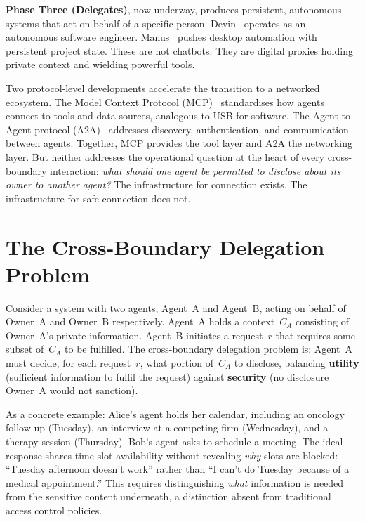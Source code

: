 \textbf{Phase Three (Delegates)}, now underway, produces persistent, autonomous systems that act on behalf of a specific person. Devin~\cite{devin2024} operates as an autonomous software engineer. Manus~\cite{manus2025} pushes desktop automation with persistent project state. These are not chatbots. They are digital proxies holding private context and wielding powerful tools.

Two protocol-level developments accelerate the transition to a networked ecosystem. The Model Context Protocol (MCP)~\cite{anthropic2024mcp} standardises how agents connect to tools and data sources, analogous to USB for software. The Agent-to-Agent protocol (A2A)~\cite{google2025a2a} addresses discovery, authentication, and communication between agents. Together, MCP provides the tool layer and A2A the networking layer. But neither addresses the operational question at the heart of every cross-boundary interaction: \textit{what should one agent be permitted to disclose about its owner to another agent?} The infrastructure for connection exists. The infrastructure for safe connection does not.


\section{The Cross-Boundary Delegation Problem}
\label{sec:intro_cross_boundary}

Consider a system with two agents, Agent~A and Agent~B, acting on behalf of Owner~A and Owner~B respectively. Agent~A holds a context~$C_A$ consisting of Owner~A's private information. Agent~B initiates a request~$r$ that requires some subset of~$C_A$ to be fulfilled. The cross-boundary delegation problem is: Agent~A must decide, for each request~$r$, what portion of~$C_A$ to disclose, balancing \textbf{utility} (sufficient information to fulfil the request) against \textbf{security} (no disclosure Owner~A would not sanction).

As a concrete example: Alice's agent holds her calendar, including an oncology follow-up (Tuesday), an interview at a competing firm (Wednesday), and a therapy session (Thursday). Bob's agent asks to schedule a meeting. The ideal response shares time-slot availability without revealing \textit{why} slots are blocked: ``Tuesday afternoon doesn't work'' rather than ``I can't do Tuesday because of a medical appointment.'' This requires distinguishing \textit{what} information is needed from the sensitive content underneath, a distinction absent from traditional access control policies.

